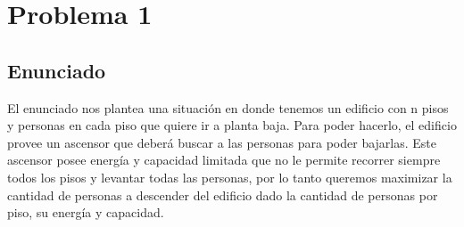 \section{Problema 1}

\subsection{Enunciado}
El enunciado nos plantea una situación en donde tenemos un edificio con n pisos y personas en cada piso que quiere ir a planta baja. Para poder hacerlo, el edificio provee un 
ascensor que deberá buscar a las personas para poder bajarlas. 
Este ascensor posee energía y capacidad limitada que no le permite recorrer siempre todos los pisos y levantar todas las personas, por lo tanto queremos maximizar la cantidad
de personas a descender del edificio dado la cantidad de personas por piso, su energía y capacidad.

